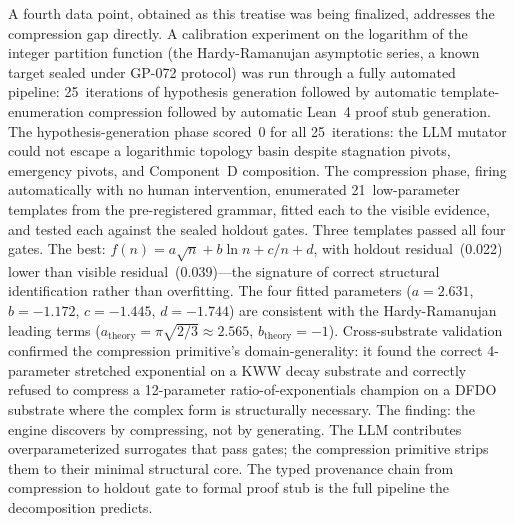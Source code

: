 \documentclass[11pt]{article}
\begin{document}
A fourth data point, obtained as this treatise was being finalized, addresses the compression gap directly. A calibration experiment on the logarithm of the integer partition function (the Hardy-Ramanujan asymptotic series, a known target sealed under GP-072 protocol) was run through a fully automated pipeline: 25~iterations of hypothesis generation followed by automatic template-enumeration compression followed by automatic Lean~4 proof stub generation. The hypothesis-generation phase scored~0 for all 25~iterations: the LLM mutator could not escape a logarithmic topology basin despite stagnation pivots, emergency pivots, and Component~D composition. The compression phase, firing automatically with no human intervention, enumerated 21~low-parameter templates from the pre-registered grammar, fitted each to the visible evidence, and tested each against the sealed holdout gates. Three templates passed all four gates. The best: $f(n) = a\sqrt{n} + b\ln n + c/n + d$, with holdout residual~(0.022) lower than visible residual~(0.039)---the signature of correct structural identification rather than overfitting. The four fitted parameters ($a{=}2.631$, $b{=}{-}1.172$, $c{=}{-}1.445$, $d{=}{-}1.744$) are consistent with the Hardy-Ramanujan leading terms ($a_{\mathrm{theory}} = \pi\sqrt{2/3} \approx 2.565$, $b_{\mathrm{theory}} = -1$). Cross-substrate validation confirmed the compression primitive's domain-generality: it found the correct 4-parameter stretched exponential on a KWW decay substrate and correctly refused to compress a 12-parameter ratio-of-exponentials champion on a DFDO substrate where the complex form is structurally necessary. The finding: the engine discovers by compressing, not by generating. The LLM contributes overparameterized surrogates that pass gates; the compression primitive strips them to their minimal structural core. The typed provenance chain from compression to holdout gate to formal proof stub is the full pipeline the decomposition predicts.
\end{document}
